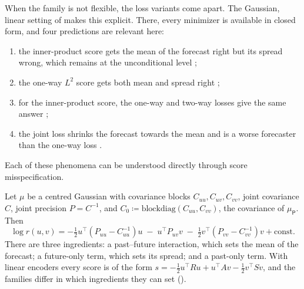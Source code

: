 \documentclass[11pt]{article}
\theoremstyle{plain}
\theoremstyle{definition}
\theoremstyle{remark}
\newcommand{\define}{\coloneqq}
\newcommand{\muP}{\mu_{\mathsf{P}}}
\begin{document}
When the family is not flexible, the loss variants come apart. The Gaussian,
linear setting of \cite[Sec.~5]{baptista2025mathematical} makes this
explicit. There, every minimizer is available in closed form, and four
predictions are relevant here:
\begin{enumerate}[label=(P\arabic*),ref=P\arabic*]
 \item \label{P1} the inner-product score gets the mean of the forecast right
       but its spread wrong, which remains at the unconditional level
       \cite[Cor.~5.2]{baptista2025mathematical};
 \item \label{P2} the one-way $L^2$ score gets both mean and spread right
       \cite[Thm.~5.3, Cor.~5.4]{baptista2025mathematical};
 \item \label{P3} for the inner-product score, the one-way and two-way losses
       give the same answer \cite[Thm.~5.1]{baptista2025mathematical};
 \item \label{P4} the joint loss shrinks the forecast towards the mean and is
       a worse forecaster than the one-way loss
       \cite[Thm.~5.6, Cor.~5.7]{baptista2025mathematical}.
\end{enumerate}
Each of these phenomena can be understood directly through score
misspecification.

Let $\mu$ be a centred Gaussian with covariance blocks $C_{uu},C_{uv},C_{vv}$,
joint covariance $C$, joint precision $P=C^{-1}$, and
$C_0\define\mathrm{blockdiag}(C_{uu},C_{vv})$, the covariance of $\muP$. Then
\begin{equation}
 \log r(u,v)=-\tfrac12u^{\top}(P_{uu}-C_{uu}^{-1})u\;-\;u^{\top}P_{uv}v
 \;-\;\tfrac12v^{\top}(P_{vv}-C_{vv}^{-1})v+\mathrm{const}.
 \label{eq:gaussianlogr}
\end{equation}
There are three ingredients: a past--future interaction, which sets the mean
of the forecast; a future-only term, which sets its spread; and a past-only
term. With linear encoders every score is of the form
$s=-\tfrac12u^{\top}Ru+u^{\top}Av-\tfrac12v^{\top}Sv$, and the families
differ in which ingredients they can set ().
\end{document}
